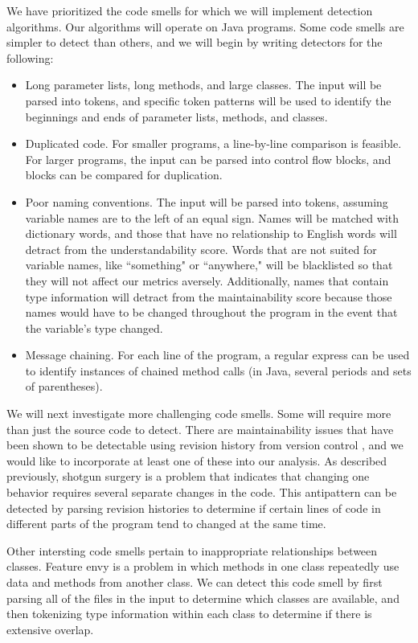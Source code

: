 \documentclass{sig-alternate}
\begin{document}
We have prioritized the code smells for which we will implement detection algorithms. Our algorithms will operate on Java programs. Some code smells are simpler to detect than others, and we will begin by writing detectors for the following:
\begin{itemize}
\item Long parameter lists, long methods, and large classes. The input will be parsed into tokens, and specific token patterns will be used to identify the beginnings and ends of parameter lists, methods, and classes.
\item Duplicated code.  For smaller programs, a line-by-line comparison is feasible. For larger programs, the input can be parsed into control flow blocks, and blocks can be compared for duplication. 
\item Poor naming conventions. The input will be parsed into tokens, assuming variable names are to the left of an equal sign. Names will be matched with dictionary words, and those that have no relationship to English words will detract from the understandability score. Words that are not suited for variable names, like ``something" or ``anywhere," will be blacklisted so that they will not affect our metrics aversely.  Additionally, names that contain type information will detract from the maintainability score because those names would have to be changed throughout the program in the event that the variable's type changed.
\item Message chaining. For each line of the program, a regular express can be used to identify instances of chained method calls (in Java, several periods and sets of  parentheses). 
\end{itemize}
We will next investigate more challenging code smells. Some will require more than just the source code to detect. There are maintainability issues that have been shown to be detectable using revision history from version control \cite{palomba}, and we would like to incorporate at least one of these into our analysis.  As described previously, shotgun surgery is a problem that indicates that changing one behavior requires several separate changes in the code.  This antipattern can be detected by parsing revision histories to determine if certain lines of code in different parts of the program tend to changed at the same time.

Other intersting code smells pertain to inappropriate relationships between classes. Feature envy is a problem in which methods in one class repeatedly use data and methods from another class. We can detect this code smell by first parsing all of the files in the input to determine which classes are available, and then tokenizing type information within each class to determine if there is extensive overlap. 
\end{document}
